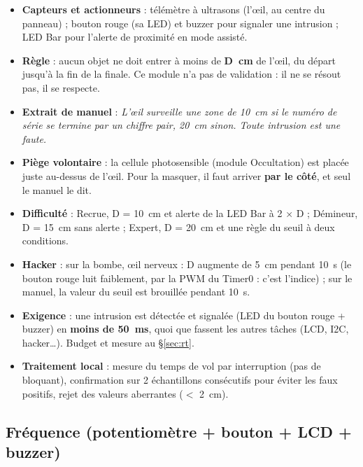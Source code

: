 \documentclass[11pt,a4paper]{article}
\newcommand{\code}[1]{\texttt{\detokenize{#1}}}
\begin{document}
\begin{itemize}
  \item \textbf{Capteurs et actionneurs} : télémètre à ultrasons (\og l'œil\fg{}, au centre du panneau) ; bouton rouge (sa LED) et buzzer pour signaler une intrusion ; LED Bar pour l'alerte de proximité en mode assisté.
  \item \textbf{Règle} : aucun objet ne doit entrer à moins de \textbf{D~cm} de l'œil, du départ jusqu'à la fin de la finale. Ce module n'a pas de validation : il ne se résout pas, il se respecte.
  \item \textbf{Extrait de manuel} : \emph{\og L'œil surveille une zone de 10~cm si le numéro de série se termine par un chiffre pair, 20~cm sinon. Toute intrusion est une faute.\fg{}}
  \item \textbf{Piège volontaire} : la cellule photosensible (module Occultation) est placée juste au-dessus de l'œil. Pour la masquer, il faut arriver \textbf{par le côté}, et seul le manuel le dit.
  \item \textbf{Difficulté} : Recrue, D = 10~cm et alerte de la LED Bar à 2 × D ; Démineur, D = 15~cm sans alerte ; Expert, D = 20~cm et une règle du seuil à deux conditions.
  \item \textbf{Hacker} : sur la bombe, \og œil nerveux\fg{} : D augmente de 5~cm pendant 10~s (le bouton rouge luit faiblement, par la PWM du Timer0 : c'est l'indice) ; sur le manuel, la valeur du seuil est brouillée pendant 10~s.
  \item \textbf{Exigence} : une intrusion est détectée et signalée (LED du bouton rouge + buzzer) en \textbf{moins de 50~ms}, quoi que fassent les autres tâches (LCD, I2C, hacker…). Budget et mesure au \S\ref{sec:rt}.
  \item \textbf{Traitement local} : mesure du temps de vol par interruption (pas de \code{pulseIn} bloquant), confirmation sur 2 échantillons consécutifs pour éviter les faux positifs, rejet des valeurs aberrantes ($<$ 2~cm).
\end{itemize}

\subsection{Fréquence (potentiomètre + bouton + LCD + buzzer)}
\label{sec:frequence}
\end{document}

